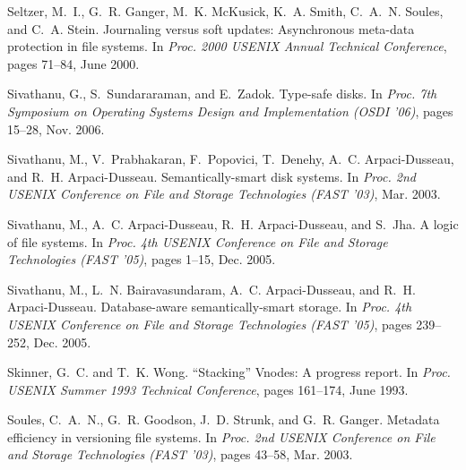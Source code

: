 \documentclass[9pt,twocolumn,letterpaper]{article}
\begin{document}
\begin{footnotesize}
\begin{thebibliography}{43}
Seltzer, M.~I., G.~R. Ganger, M.~K. McKusick, K.~A. Smith, C.~A.~N. Soules, and
  C.~A. Stein.
\newblock Journaling versus soft updates: Asynchronous meta-data protection in
  file systems.
\newblock In \emph{Proc. 2000 {USENIX} Annual Technical Conference}, pages
  71--84, June 2000.

Sivathanu, G., S.~Sundararaman, and E.~Zadok.
\newblock Type-safe disks.
\newblock In \emph{Proc. 7th Symposium on Operating Systems Design and
  Implementation ({OSDI} '06)}, pages 15--28, Nov. 2006.

Sivathanu, M., V.~Prabhakaran, F.~Popovici, T.~Denehy, A.~C. Arpaci-Dusseau,
  and R.~H. Arpaci-Dusseau.
\newblock Semantically-smart disk systems.
\newblock In \emph{Proc. 2nd {USENIX} Conference on File and Storage
  Technologies ({FAST} '03)}, Mar. 2003.

Sivathanu, M., A.~C. Arpaci-Dusseau, R.~H. Arpaci-Dusseau, and S.~Jha.
\newblock A logic of file systems.
\newblock In \emph{Proc. 4th {USENIX} Conference on File and Storage
  Technologies ({FAST} '05)}, pages 1--15, Dec. 2005{}.

Sivathanu, M., L.~N. Bairavasundaram, A.~C. Arpaci-Dusseau, and R.~H.
  Arpaci-Dusseau.
\newblock Database-aware semantically-smart storage.
\newblock In \emph{Proc. 4th {USENIX} Conference on File and Storage
  Technologies ({FAST} '05)}, pages 239--252, Dec. 2005{}.

Skinner, G.~C. and T.~K. Wong.
\newblock ``{S}tacking'' {V}nodes: A progress report.
\newblock In \emph{Proc. USENIX Summer 1993 Technical Conference}, pages
  161--174, June 1993.

Soules, C.~A.~N., G.~R. Goodson, J.~D. Strunk, and G.~R. Ganger.
\newblock Metadata efficiency in versioning file systems.
\newblock In \emph{Proc. 2nd {USENIX} Conference on File and Storage
  Technologies ({FAST} '03)}, pages 43--58, Mar. 2003.


\end{thebibliography}
\end{footnotesize}
\end{document}
